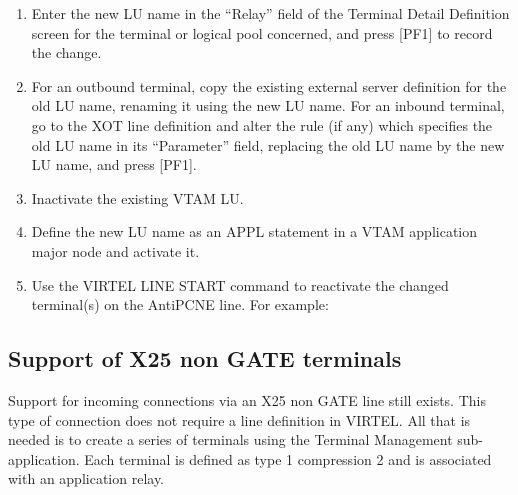 \documentclass[letterpaper,10pt,english]{sphinxmanual}
\begin{document}
\begin{enumerate}
\def\theenumi{\arabic{enumi}}
\def\labelenumi{\theenumi .}
\makeatletter\def\p@enumii{\p@enumi \theenumi .}\makeatother
\item {} 
Enter the new LU name in the “Relay” field of the Terminal Detail Definition screen for the terminal or logical pool concerned, and press {[}PF1{]} to record the change.

\item {} 
For an outbound terminal, copy the existing external server definition for the old LU name, renaming it using the new LU name. For an inbound terminal, go to the XOT line definition and alter the rule (if any) which specifies the old LU name in its “Parameter” field, replacing the old LU name by the new LU name, and press {[}PF1{]}.

\item {} 
Inactivate the existing VTAM LU.

\item {} 
Define the new LU name as an APPL statement in a VTAM application major node and activate it.

\item {} 
Use the VIRTEL LINE START command to reactivate the changed terminal(s) on the AntiPCNE line. For example: 

\end{enumerate}

\ignorespaces 

\subsection{Support of X25 non GATE terminals}
\label{\detokenize{connectivity_guide:support-of-x25-non-gate-terminals}}\label{\detokenize{connectivity_guide:index-87}}
Support for incoming connections via an X25 non GATE line still exists. This type of connection does not require a line definition in VIRTEL. All that is needed is to create a series of terminals using the Terminal Management sub- application. Each terminal is defined as type 1 compression 2 and is associated with an application relay.
\end{document}
